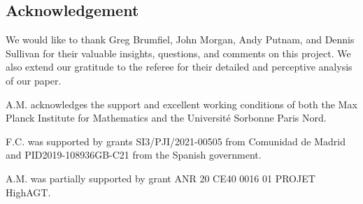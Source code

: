 
\subsection*{Acknowledgement}

We would like to thank Greg Brumfiel, John Morgan, Andy Putnam, and Dennis Sullivan for their valuable insights, questions, and comments on this project.
We also extend our gratitude to the referee for their detailed and perceptive analysis of our paper.

A.M. acknowledges the support and excellent working conditions of both the Max Planck Institute for Mathematics and the Universit\'e Sorbonne Paris Nord.

F.C. was supported by grants SI3/PJI/2021-00505 from Comunidad de Madrid and PID2019-108936GB-C21 from the Spanish government.

A.M. was partially supported by grant ANR 20 CE40 0016 01 PROJET HighAGT.